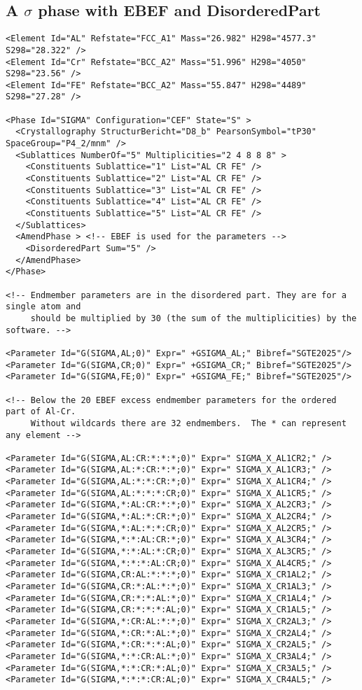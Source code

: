 \documentclass[preprint,review,12pt]{elsarticle}
\begin{document}
\begin{appendix}
\subsection{A $\sigma$ phase with EBEF and DisorderedPart}\label{sc:sigma-ebef}

{\small
\begin{verbatim}
<Element Id="AL" Refstate="FCC_A1" Mass="26.982" H298="4577.3" S298="28.322" />
<Element Id="Cr" Refstate="BCC_A2" Mass="51.996" H298="4050" S298="23.56" />
<Element Id="FE" Refstate="BCC_A2" Mass="55.847" H298="4489" S298="27.28" />

<Phase Id="SIGMA" Configuration="CEF" State="S" >
  <Crystallography StructurBericht="D8_b" PearsonSymbol="tP30" SpaceGroup="P4_2/mnm" />
  <Sublattices NumberOf="5" Multiplicities="2 4 8 8 8" >
    <Constituents Sublattice="1" List="AL CR FE" />
    <Constituents Sublattice="2" List="AL CR FE" />
    <Constituents Sublattice="3" List="AL CR FE" />
    <Constituents Sublattice="4" List="AL CR FE" />
    <Constituents Sublattice="5" List="AL CR FE" />
  </Sublattices>
  <AmendPhase > <!-- EBEF is used for the parameters -->
    <DisorderedPart Sum="5" />
  </AmendPhase>
</Phase>

<!-- Endmember parameters are in the disordered part. They are for a single atom and
     should be multiplied by 30 (the sum of the multiplicities) by the software. -->

<Parameter Id="G(SIGMA,AL;0)" Expr=" +GSIGMA_AL;" Bibref="SGTE2025"/>
<Parameter Id="G(SIGMA,CR;0)" Expr=" +GSIGMA_CR;" Bibref="SGTE2025"/>
<Parameter Id="G(SIGMA,FE;0)" Expr=" +GSIGMA_FE;" Bibref="SGTE2025"/>

<!-- Below the 20 EBEF excess endmember parameters for the ordered part of Al-Cr.  
     Without wildcards there are 32 endmembers.  The * can represent any element -->

<Parameter Id="G(SIGMA,AL:CR:*:*:*;0)" Expr=" SIGMA_X_AL1CR2;" />
<Parameter Id="G(SIGMA,AL:*:CR:*:*;0)" Expr=" SIGMA_X_AL1CR3;" />
<Parameter Id="G(SIGMA,AL:*:*:CR:*;0)" Expr=" SIGMA_X_AL1CR4;" />
<Parameter Id="G(SIGMA,AL:*:*:*:CR;0)" Expr=" SIGMA_X_AL1CR5;" />
<Parameter Id="G(SIGMA,*:AL:CR:*:*;0)" Expr=" SIGMA_X_AL2CR3;" />
<Parameter Id="G(SIGMA,*:AL:*:CR:*;0)" Expr=" SIGMA_X_AL2CR4;" />
<Parameter Id="G(SIGMA,*:AL:*:*:CR;0)" Expr=" SIGMA_X_AL2CR5;" />
<Parameter Id="G(SIGMA,*:*:AL:CR:*;0)" Expr=" SIGMA_X_AL3CR4;" />
<Parameter Id="G(SIGMA,*:*:AL:*:CR;0)" Expr=" SIGMA_X_AL3CR5;" />
<Parameter Id="G(SIGMA,*:*:*:AL:CR;0)" Expr=" SIGMA_X_AL4CR5;" />
<Parameter Id="G(SIGMA,CR:AL:*:*:*;0)" Expr=" SIGMA_X_CR1AL2;" />
<Parameter Id="G(SIGMA,CR:*:AL:*:*;0)" Expr=" SIGMA_X_CR1AL3;" />
<Parameter Id="G(SIGMA,CR:*:*:AL:*;0)" Expr=" SIGMA_X_CR1AL4;" />
<Parameter Id="G(SIGMA,CR:*:*:*:AL;0)" Expr=" SIGMA_X_CR1AL5;" />
<Parameter Id="G(SIGMA,*:CR:AL:*:*;0)" Expr=" SIGMA_X_CR2AL3;" />
<Parameter Id="G(SIGMA,*:CR:*:AL:*;0)" Expr=" SIGMA_X_CR2AL4;" />
<Parameter Id="G(SIGMA,*:CR:*:*:AL;0)" Expr=" SIGMA_X_CR2AL5;" />
<Parameter Id="G(SIGMA,*:*:CR:AL:*;0)" Expr=" SIGMA_X_CR3AL4;" />
<Parameter Id="G(SIGMA,*:*:CR:*:AL;0)" Expr=" SIGMA_X_CR3AL5;" />
<Parameter Id="G(SIGMA,*:*:*:CR:AL;0)" Expr=" SIGMA_X_CR4AL5;" />


\end{verbatim}}
\end{appendix}
\end{document}
